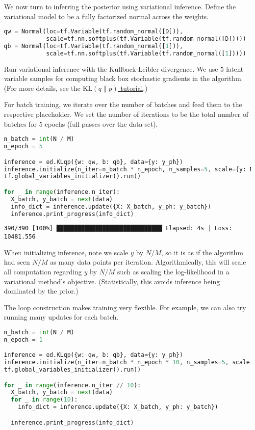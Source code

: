 We now turn to inferring the posterior using variational inference.
Define the variational model to be a fully factorized normal across
the weights.
\begin{lstlisting}[language=Python]
qw = Normal(loc=tf.Variable(tf.random_normal([D])),
            scale=tf.nn.softplus(tf.Variable(tf.random_normal([D]))))
qb = Normal(loc=tf.Variable(tf.random_normal([1])),
            scale=tf.nn.softplus(tf.Variable(tf.random_normal([1]))))
\end{lstlisting}

Run variational inference with the Kullback-Leibler divergence.
We use $5$ latent variable samples for computing
black box stochastic gradients in the algorithm.
(For more details, see the
\href{/tutorials/klqp}{$\text{KL}(q\|p)$ tutorial}.)

For batch training, we iterate over the number of batches and
feed them to the respective placeholder. We set the number of
iterations to be the total number of batches for 5 epochs
(full passes over the data set).

\begin{lstlisting}[language=Python]
n_batch = int(N / M)
n_epoch = 5

inference = ed.KLqp({w: qw, b: qb}, data={y: y_ph})
inference.initialize(n_iter=n_batch * n_epoch, n_samples=5, scale={y: N / M})
tf.global_variables_initializer().run()

for _ in range(inference.n_iter):
  X_batch, y_batch = next(data)
  info_dict = inference.update({X: X_batch, y_ph: y_batch})
  inference.print_progress(info_dict)
\end{lstlisting}

\begin{lstlisting}
390/390 [100%] ██████████████████████████████ Elapsed: 4s | Loss: 10481.556
\end{lstlisting}

When initializing inference, note we scale $y$ by $N/M$, so it is as if the
algorithm had seen $N/M$ as many data points per iteration.
Algorithmically, this will scale all computation regarding $y$ by
$N/M$ such as scaling the log-likelihood in a variational method's
objective. (Statistically, this avoids inference being dominated by the prior.)

The loop construction makes training very flexible. For example, we
can also try running many updates for each batch.

\begin{lstlisting}[language=Python]
n_batch = int(N / M)
n_epoch = 1

inference = ed.KLqp({w: qw, b: qb}, data={y: y_ph})
inference.initialize(n_iter=n_batch * n_epoch * 10, n_samples=5, scale={y: N / M})
tf.global_variables_initializer().run()

for _ in range(inference.n_iter // 10):
  X_batch, y_batch = next(data)
  for _ in range(10):
    info_dict = inference.update({X: X_batch, y_ph: y_batch})

  inference.print_progress(info_dict)
\end{lstlisting}


